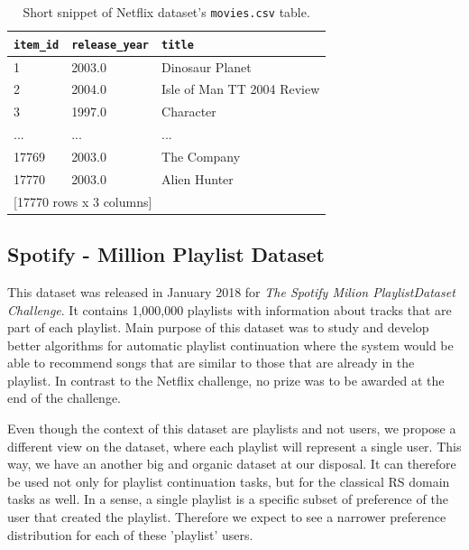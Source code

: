 \begin{table}[!ht]
    \centering
    \begin{tabular}{ l l l }
        \verb|item_id| & \verb|release_year| & \verb|title| \\
        \hline
            1 &       2003.0 &            Dinosaur Planet    \\
            2 &       2004.0 & Isle of Man TT 2004 Review    \\
            3 &       1997.0 &                  Character    \\
          ... &          ... &                        ...    \\
        17769 &       2003.0 &                The Company    \\
        17770 &       2003.0 &               Alien Hunter \\ [1mm]
        \multicolumn{3}{l}{{[17770 rows x 3 columns]}}
    \end{tabular}
    \caption{Short snippet of Netflix dataset's \texttt{movies.csv} table.}
    \label{table:5.1_Netflix_movies}
\end{table}
\subsection{Spotify - Million Playlist Dataset}
This dataset was released in January 2018 for \textit{The Spotify Milion PlaylistDataset Challenge}. It contains 1,000,000 playlists with information about tracks that are part of each playlist. Main purpose of this dataset was to study and develop better algorithms for automatic playlist continuation where the system would be able to recommend songs that are similar to those that are already in the playlist. In contrast to the Netflix challenge, no prize was to be awarded at the end of the challenge.

Even though the context of this dataset are playlists and not users, we propose a different view on the dataset, where each playlist will represent a single user. This way, we have an another big and organic dataset at our disposal. It can therefore be used not only for playlist continuation tasks, but for the classical RS domain tasks as well. In a sense, a single playlist is a specific subset of preference of the user that created the playlist. Therefore we expect to see a narrower preference distribution for each of these 'playlist' users.

